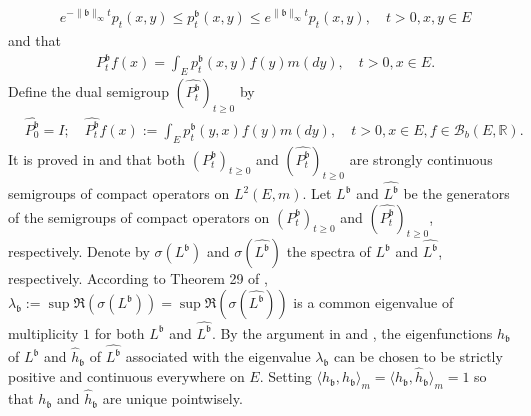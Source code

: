 \documentclass[12pt,a4paper]{amsart}
\numberwithin{equation}{section}
\theoremstyle{plain}
\theoremstyle{definition}
\theoremstyle{remark}
\newcounter{N}
\newcounter{n}[N]
\begin{document}
\begin{align} \label{eq:IU.0}
& e^{-\|\mathfrak b\|_\infty t} p_t(x,y) \leq p_t^\mathfrak b(x,y) \leq e^{\|\mathfrak b\|_\infty t}p_t(x,y),\quad t>0, x,y\in E\end{align}
and that
\begin{align} & P_t^\mathfrak b f(x) = \int_E p_t^\mathfrak b(x,y) f(y) m(dy),\quad t>0, x\in E. \end{align}
Define the dual semigroup $(\widehat {P^{\mathfrak b}_t} )_{t\geq 0}$ by
\begin{align} & \widehat {P_0^{\mathfrak b}}=I; \quad \widehat {P_t^{\mathfrak b}} f(x):= \int_E p_t^\mathfrak b(y,x) f(y) m(dy), \quad t>0,x\in E, f\in \mathcal B_b(E,\mathbb R). \end{align}
It is proved in \cite{RenSongZhang2015Limit} and \cite{RenSongZhang2017Central} that both $(P_t^\mathfrak b)_{t\geq 0}$ and $(\widehat {P_t^\mathfrak b})_{t\geq 0}$ are strongly continuous semigroups of compact operators on $L^2(E,m)$.
Let $L^\mathfrak b$ and $\widehat {L^\mathfrak b}$ be the generators of the semigroups of compact operators on $(P_t^\mathfrak b)_{t\geq 0}$ and $(\widehat {P_t^\mathfrak b})_{t\geq 0}$, respectively.
Denote by $\sigma(L^\mathfrak b)$ and $\sigma(\widehat{L^\mathfrak b})$ the spectra of $L^\mathfrak b$ and $\widehat {L^{\mathfrak b}}$, respectively.
According to Theorem 29 of \cite{Schaefer1974Banach}, $\lambda_\mathfrak b:= \sup \Re(\sigma(L^\mathfrak b)) = \sup \Re(\sigma( \widehat{L^\mathfrak b})) $ is a common eigenvalue of multiplicity $1$ for both $L^\mathfrak b$ and $\widehat {L^{\mathfrak b}}$.
By the argument in \cite{RenSongZhang2015Limit} and \cite{RenSongZhang2017Central}, the eigenfunctions $h_\mathfrak b$ of $L^\mathfrak b$ and $\widehat h_\mathfrak b$ of $\widehat{L^\mathfrak b}$ associated with the eigenvalue $\lambda_\mathfrak b$ can be chosen to be strictly positive and continuous everywhere on $E$.
Setting $\langle h_\mathfrak b,h_\mathfrak b\rangle_m = \langle h_\mathfrak b, \widehat h_\mathfrak b\rangle_m = 1$ so that $h_\mathfrak b$ and $\widehat h_\mathfrak b$ are unique pointwisely.
\end{document}
